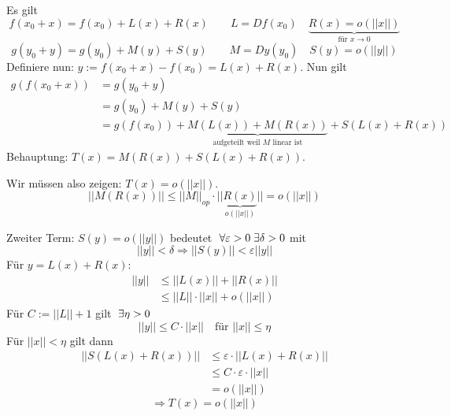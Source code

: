 \documentclass[main.tex]{subfiles}
\begin{document}
\begin{Beweis}
 Es gilt
 $$f(x_0 + x) = f(x_0) + L(x) + R(x) \qquad L = D f(x_0) \quad \underbrace{R(x) = {\scriptstyle o}(||x||)}_{\text{für } x \to 0}$$
 $$g(y_0 + y) = g(y_0) + M(y) + S(y) \qquad M = D y (y_0) \quad S(y) = {\scriptstyle o}(||y||)$$
 Definiere nun: $y:= f(x_0 + x) - f(x_0) = L(x) + R(x)$. Nun gilt
 $$\begin{aligned}
   g(f(x_0 + x)) & = g(y_0 + y) \\
   & = g(y_0) + M(y) + S(y) \\
   & = g(f(x_0)) + \underbrace{M(L(x)) + M(R(x))}_{\text{aufgeteilt weil $M$ linear ist}} + S(L(x) + R(x))
 \end{aligned}$$
 Behauptung: $T(x) = M(R(x)) + S(L(x) + R(x))$.

 Wir müssen also zeigen: $T(x) = o(||x||)$.
 $$||M(R(x))|| \leq ||M||_{op} \cdot ||\underbrace{R(x)}_{o(||x||)}|| = o(||x||)$$

 Zweiter Term: $S(y) = o(||y||)$ bedeutet $\;\forall \varepsilon > 0 \;\exists \delta > 0$ mit
 $$||y|| < \delta \Rightarrow ||S(y)|| < \varepsilon ||y||$$
 Für $y = L(x) + R(x)$:
 $$\begin{aligned}
   ||y|| & \leq ||L(x)|| + ||R(x)|| \\
   & \leq ||L||\cdot ||x|| + o(||x||)
 \end{aligned}$$
 Für $C := ||L|| + 1$ gilt $\;\exists \eta > 0$
 $$||y|| \leq C \cdot ||x|| \quad \text{für } ||x|| \leq \eta$$
 Für $||x|| < \eta$ gilt dann
 $$\begin{aligned}
   ||S(L(x) + R(x))|| & \leq \varepsilon \cdot ||L(x) + R(x)|| \\
   & \leq  C \cdot \varepsilon \cdot ||x|| \\
   & = o(||x||)
 \end{aligned}$$
 $$\Rightarrow T(x) = o(||x||)$$
\end{Beweis}
\end{document}
